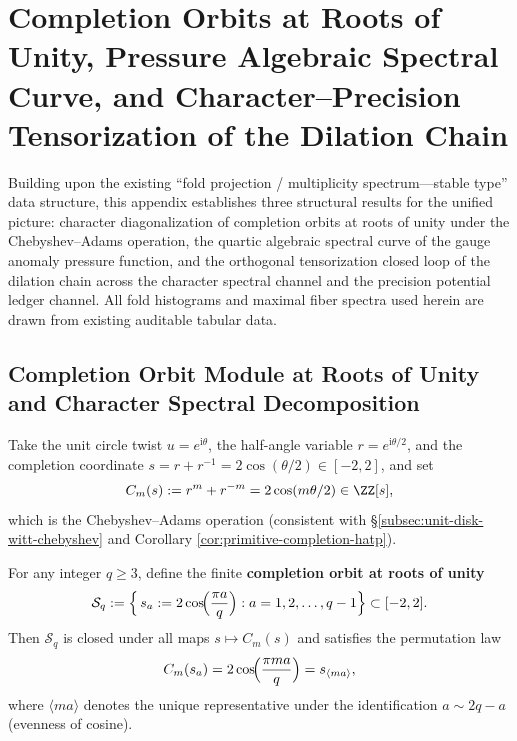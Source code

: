 
\section{Completion Orbits at Roots of Unity, Pressure Algebraic Spectral Curve, and Character--Precision Tensorization of the Dilation Chain}\label{app:root-unit-character-pressure-tensor}

Building upon the existing ``fold projection / multiplicity spectrum---stable type'' data structure, this appendix establishes three structural results for the unified picture: character diagonalization of completion orbits at roots of unity under the Chebyshev--Adams operation, the quartic algebraic spectral curve of the gauge anomaly pressure function, and the orthogonal tensorization closed loop of the dilation chain across the character spectral channel and the precision potential ledger channel. All fold histograms and maximal fiber spectra used herein are drawn from existing auditable tabular data.

\subsection{Completion Orbit Module at Roots of Unity and Character Spectral Decomposition}\label{subsec:root-unit-completion-orbit-character}

Take the unit circle twist \(u=e^{\mathrm{i}\theta}\), the half-angle variable \(r=e^{\mathrm{i}\theta/2}\), and the completion coordinate
\(s=r+r^{-1}=2\cos(\theta/2)\in[-2,2]\), and set
\begin{equation}\label{eq:chebyshev-adams-Cm}
C_m(s):=r^m+r^{-m}=2\cos(m\theta/2)\in\ZZ[s],
\end{equation}
which is the Chebyshev--Adams operation (consistent with \S\ref{subsec:unit-disk-witt-chebyshev} and Corollary \ref{cor:primitive-completion-hatp}).

For any integer \(q\ge 3\), define the finite \textbf{completion orbit at roots of unity}
\begin{equation}\label{eq:root-unit-orbit-Sq}
\mathcal{S}_q:=\Bigl\{\, s_a:=2\cos\!\Bigl(\frac{\pi a}{q}\Bigr) : a=1,2,\dots,q-1 \Bigr\}\subset[-2,2].
\end{equation}
Then \(\mathcal{S}_q\) is closed under all maps \(s\mapsto C_m(s)\) and satisfies the permutation law
\begin{equation}\label{eq:root-unit-Cm-permutation}
C_m(s_a)=2\cos\!\Bigl(\frac{\pi m a}{q}\Bigr)=s_{\langle ma\rangle},
\end{equation}
where \(\langle ma\rangle\) denotes the unique representative under the identification \(a\sim 2q-a\) (evenness of cosine).

